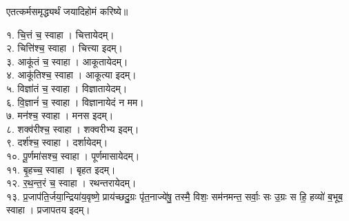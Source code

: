 
एतत्कर्मसमृद्ध्यर्थं जयादिहोमं करिष्ये॥

१. चि॒त्तं च॒ स्वाहा। चित्तायेदम्।\\
२. चित्ति॑श्च॒ स्वाहा। चित्त्या इदम्।\\
३. आकू॑तं च॒ स्वाहा। आकूतायेदम्।\\
४. आकू॑तिश्च॒ स्वाहा। आकूत्या इदम्।\\
५. विज्ञा॑तं च॒ स्वाहा। विज्ञातायेदम्।\\
६. वि॒ज्ञानं॑ च॒ स्वाहा। विज्ञानायेदं न मम।\\
७. मन॑श्च॒ स्वाहा। मनस इदम्।\\
८. शक्व॑रीश्च॒ स्वाहा। शक्वरीभ्य इदम्।\\
९. दर्श॑श्च॒ स्वाहा। दर्शायेदम्।\\
१०. पू॒र्णमा॑सश्च॒ स्वाहा। पूर्णमासायेदम्।\\
११. बृ॒हच्च॒ स्वाहा। बृहत इदम्।\\
१२. र॒थ॒न्त॒रं च॒ स्वाहा। रथन्तरायेदम्।\\
१३. प्र॒जाप॑ति॒र्जया॒न्द्रिया॑य॒वृष्णे॒ प्राय॑च्छदु॒ग्रः पृ॑त॒नाज्ये॑षु॒ तस्मै॒ विशः॒ सम॑नमन्त॒ सर्वाः॒ सः उ॒ग्रः स हि॒ हव्यो॑ ब॒भूब॒ स्वाहा। प्रजापतय इदम्।\\

